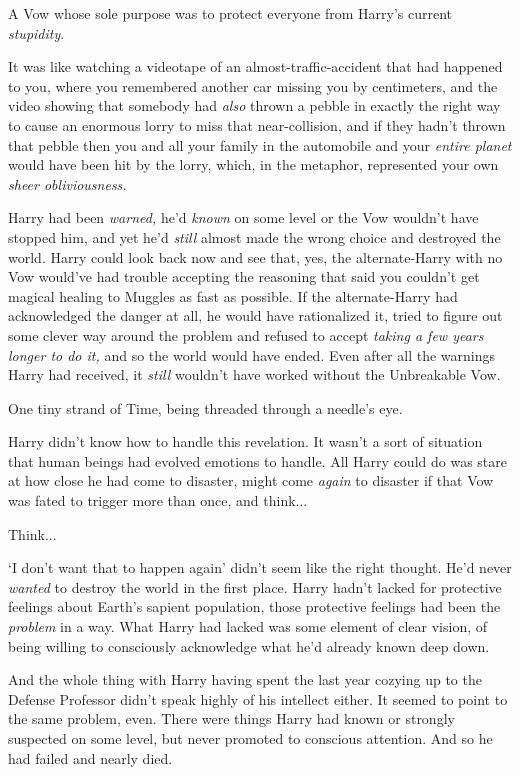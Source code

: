 A Vow whose sole purpose was to protect everyone from Harry's current \emph{stupidity}.

It was like watching a videotape of an almost-traffic-accident that had happened to you, where you remembered another car missing you by centimeters, and the video showing that somebody had \emph{also} thrown a pebble in exactly the right way to cause an enormous lorry to miss that near-collision, and if they hadn't thrown that pebble then you and all your family in the automobile and your \emph{entire planet} would have been hit by the lorry, which, in the metaphor, represented your own \emph{sheer obliviousness.}

Harry had been \emph{warned,} he'd \emph{known} on some level or the Vow wouldn't have stopped him, and yet he'd \emph{still} almost made the wrong choice and destroyed the world. Harry could look back now and see that, yes, the alternate-Harry with no Vow would've had trouble accepting the reasoning that said you couldn't get magical healing to Muggles as fast as possible. If the alternate-Harry had acknowledged the danger at all, he would have rationalized it, tried to figure out some clever way around the problem and refused to accept \emph{taking a few years longer to do it,} and so the world would have ended. Even after all the warnings Harry had received, it \emph{still} wouldn't have worked without the Unbreakable Vow.

One tiny strand of Time, being threaded through a needle's eye.

Harry didn't know how to handle this revelation. It wasn't a sort of situation that human beings had evolved emotions to handle. All Harry could do was stare at how close he had come to disaster, might come \emph{again} to disaster if that Vow was fated to trigger more than once, and think...

Think...

`I don't want that to happen again' didn't seem like the right thought. He'd never \emph{wanted} to destroy the world in the first place. Harry hadn't lacked for protective feelings about Earth's sapient population, those protective feelings had been the \emph{problem} in a way. What Harry had lacked was some element of clear vision, of being willing to consciously acknowledge what he'd already known deep down.

And the whole thing with Harry having spent the last year cozying up to the Defense Professor didn't speak highly of his intellect either. It seemed to point to the same problem, even. There were things Harry had known or strongly suspected on some level, but never promoted to conscious attention. And so he had failed and nearly died.

